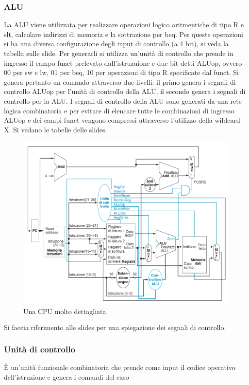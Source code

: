 \subsubsection{ALU}
La ALU viene utilizzata per realizzare operazioni logico aritmentiche di tipo R e slt, calcolare indirizzi di memoria e la sottrazione per beq. Per queste operazioni si
ha una diversa configurazione degli input di controllo (a 4 bit), si veda la tabella sulle slide. Per generarli si utilizza un'unit\`a di controllo che prende in 
ingresso il campo funct prelevato dall'istruzuione e due bit detti ALUop, ovvero 00 per sw e lw, 01 per beq, 10 per operazioni di tipo R specificate dal funct. Si genera
pertanto un comando attraverso due livelli: il primo genera i segnali di controllo ALUop per l'unit\`a di controllo della ALU, il secondo genera i segnali di controllo
per la ALU. I segnali di controllo della ALU sono generati da una rete logica combinatoria e per evitare di elencare tutte le combinazioni di ingresso ALUop e dei campi
funct vengono compressi attraverso l'utilizzo della wildcard X. Si vedano le tabelle delle slides.
\newpage
 \begin{figure}
  \includegraphics[scale=0.2]{Pictures/CPUComplessiva.png}
  \caption{Una CPU molto dettagliata}
  \label{fig:boat1}
\end{figure}
Si faccia riferimento alle slides per una spiegazione dei segnali di controllo. 
\subsubsection{Unit\`a di controllo}
\`E un'unit\`a funzionale combinatoria che prende come input il codice operativo dell'istruzione e genera i comandi del caso 
